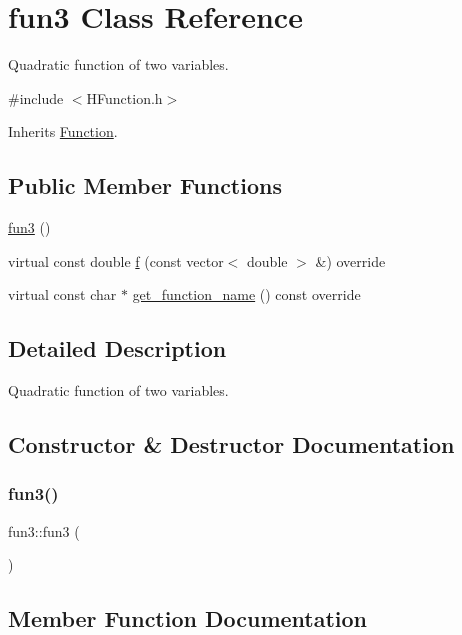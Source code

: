 \hypertarget{classfun3}{}\section{fun3 Class Reference}
\label{classfun3}


Quadratic function of two variables.  




{\ttfamily \#include $<$H\+Function.\+h$>$}



Inherits \hyperlink{class_function}{Function}.

\subsection*{Public Member Functions}
\begin{DoxyCompactItemize}
\item 
\hyperlink{classfun3_a5fbc8d16f500fdc6168219b29a289350}{fun3} ()
\item 
virtual const double \hyperlink{classfun3_a6c801db638950a09e1ee4e5199ce511b}{f} (const vector$<$ double $>$ \&) override
\item 
virtual const char $\ast$ \hyperlink{classfun3_a51588a69a8a3a5c2a372b3c678e7d5a5}{get\+\_\+function\+\_\+name} () const override
\end{DoxyCompactItemize}


\subsection{Detailed Description}
Quadratic function of two variables. 

\subsection{Constructor \& Destructor Documentation}
\mbox{\label{classfun3_a5fbc8d16f500fdc6168219b29a289350}} 
\subsubsection{\texorpdfstring{fun3()}{fun3()}}
{\footnotesize\ttfamily fun3\+::fun3 (\begin{DoxyParamCaption}{ }\end{DoxyParamCaption})}



\subsection{Member Function Documentation}
\mbox{\label{classfun3_a6c801db638950a09e1ee4e5199ce511b}} 
